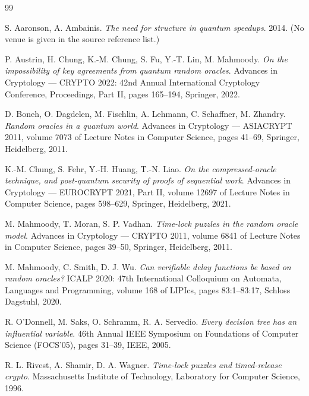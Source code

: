 \documentclass{aicr-conjecture}
\begin{document}
\begin{aicrbibliography}{99}

S. Aaronson, A. Ambainis.
\emph{The need for structure in quantum speedups}.
2014. (No venue is given in the source reference list.)

P. Austrin, H. Chung, K.-M. Chung, S. Fu, Y.-T. Lin, M. Mahmoody.
\emph{On the impossibility of key agreements from quantum random oracles}.
Advances in Cryptology --- CRYPTO 2022: 42nd Annual International
Cryptology Conference, Proceedings, Part II, pages 165--194, Springer,
2022.

D. Boneh, O. Dagdelen, M. Fischlin, A. Lehmann, C. Schaffner, M. Zhandry.
\emph{Random oracles in a quantum world}.
Advances in Cryptology --- ASIACRYPT 2011, volume 7073 of Lecture Notes in
Computer Science, pages 41--69, Springer, Heidelberg, 2011.

K.-M. Chung, S. Fehr, Y.-H. Huang, T.-N. Liao.
\emph{On the compressed-oracle technique, and post-quantum security of
proofs of sequential work}.
Advances in Cryptology --- EUROCRYPT 2021, Part II, volume 12697 of Lecture
Notes in Computer Science, pages 598--629, Springer, Heidelberg, 2021.

M. Mahmoody, T. Moran, S. P. Vadhan.
\emph{Time-lock puzzles in the random oracle model}.
Advances in Cryptology --- CRYPTO 2011, volume 6841 of Lecture Notes in
Computer Science, pages 39--50, Springer, Heidelberg, 2011.

M. Mahmoody, C. Smith, D. J. Wu.
\emph{Can verifiable delay functions be based on random oracles?}
ICALP 2020: 47th International Colloquium on Automata, Languages and
Programming, volume 168 of LIPIcs, pages 83:1--83:17, Schloss Dagstuhl,
2020.

R. O'Donnell, M. Saks, O. Schramm, R. A. Servedio.
\emph{Every decision tree has an influential variable}.
46th Annual IEEE Symposium on Foundations of Computer Science (FOCS'05),
pages 31--39, IEEE, 2005.

R. L. Rivest, A. Shamir, D. A. Wagner.
\emph{Time-lock puzzles and timed-release crypto}.
Massachusetts Institute of Technology, Laboratory for Computer Science,
1996.

\end{aicrbibliography}
\end{document}
